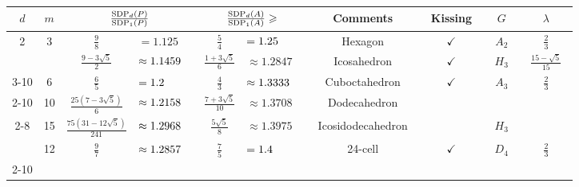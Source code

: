 \documentclass[10pt,aps,notitlepage,onecolumn,pra,superscriptaddress]{revtex4-1}
\renewcommand{\geq}{\geqslant}
\newcommand\sdp[2]{\mathrm{SDP}_{#1}\ifx#2\empty\else\left({#2}\right)\fi}
\begin{document}
\begin{table}[ht!]
  \centering
  \begin{tabular}{|c|c|cl|cl|c|c|c|c|}
    \hline
    ~$d$~                & $m$                 & \multicolumn{2}{c|}{$\frac{\sdp{d}{P}}{\sdp{1}{P}}$}                               & \multicolumn{2}{c|}{$\frac{\sdp{d}{A}}{\sdp{1}{A}}\geq$}                              & Comments              & ~Kissing~    & $G$                     & $\lambda$                \\ \hline
    2                    & 3                   & $\frac98$                               & $=1.125$                                 & $\frac54$                                 & $=1.25\hphantom{00^*}$~\cite{DVP24}       & Hexagon               & $\checkmark$ & ~$A_2$~                 & $\frac23$                \\ \hline
                         &                     & $\frac{9-3\sqrt5}{2}$                   & $\approx1.1459\hphantom{^*}$~\cite{PV22} & $\frac{1+3\sqrt5}{6}$                     & $\approx1.2847$                           & Icosahedron           & $\checkmark$ & $H_3$                   & ~$\frac{15-\sqrt5}{15}$~ \\ \cline{3-10}
                         & \multirow{-2}{*}{6} & $\frac65$                               & $=1.2\hphantom{000^*}$~\cite{FR94}       & $\frac43$                                 & $\approx1.3333\hphantom{^*}$~\cite{FR94}  & Cuboctahedron         & $\checkmark$ & $A_3$                   & $\frac23$                \\ \cline{2-10}
                         & 10                  & $\frac{25(7-3\sqrt5)}{6}$               & $\approx1.2158\hphantom{^*}$~\cite{PV22} & $\frac{7+3\sqrt5}{10}$                    & $\approx1.3708$                           & Dodecahedron          &              &                         &                          \\ \cline{2-8}\cline{10-10}
    \multirow{-4}{*}{3}  & 15                  & $\frac{75(31-12\sqrt5)}{241}$           & $\approx1.2968\hphantom{^*}$             & $\frac{5\sqrt5}{8}$                       & $\approx1.3975$                           & ~Icosidodecahedron~   &              & \multirow{-2}{*}{$H_3$} &                          \\ \hline
                         & 12                  & $\frac97$                               & $\approx1.2857\hphantom{^*}$~\cite{FR94} & $\frac75$                                 & $=1.4\hphantom{000^*}$~\cite{FR94}        & 24-cell               & $\checkmark$ & $D_4$                   & $\frac23$                \\ \cline{2-10}

\end{tabular}
\end{table}
\end{document}
